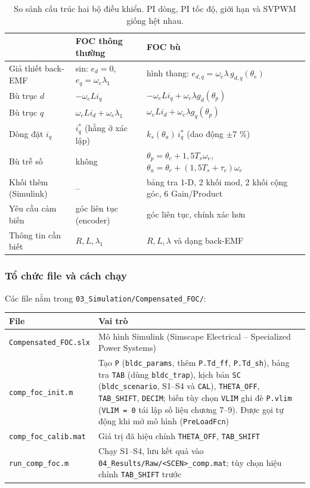 \begin{table}[H]
\centering\small
\caption{So sánh cấu trúc hai bộ điều khiển. PI dòng, PI tốc độ, giới hạn và SVPWM giống hệt nhau.}\label{tab:6.1}
\begin{tabularx}{\linewidth}{@{}ll>{\raggedright\arraybackslash}X@{}}
\toprule
 & FOC thông thường & FOC bù \\ \midrule
Giả thiết back-EMF & sin: $e_d = 0$, $e_q = \omega_e\lambda_1$ & hình thang: $e_{d,q} = \omega_e\lambda\, g_{d,q}(\theta_e)$ \\
Bù trục $d$ & $-\omega_e L i_q$ & $-\omega_e L i_q + \omega_e\lambda g_d(\theta_p)$ \\
Bù trục $q$ & $\omega_e L i_d + \omega_e\lambda_1$ & $\omega_e L i_d + \omega_e\lambda g_q(\theta_p)$ \\
Dòng đặt $i_q$ & $i_q^*$ (hằng ở xác lập) & $k_s(\theta_a)\, i_q^*$ (dao động $\pm$7 \%) \\
Bù trễ số & không & $\theta_p = \theta_e + 1{,}5T_s\omega_e$, $\theta_a = \theta_e + (1{,}5T_s+\tau_c)\omega_e$ \\
Khối thêm (Simulink) & – & 3 bảng tra 1-D, 2 khối mod, 2 khối cộng góc, 6 Gain/Product \\
Yêu cầu cảm biến & góc liên tục (encoder) & góc liên tục, chính xác hơn \\
Thông tin cần biết & $R, L, \lambda_1$ & $R, L, \lambda$ và dạng back-EMF \\
\bottomrule
\end{tabularx}
\end{table}

\subsubsection{Tổ chức file và cách chạy}\label{sec:6.7.2}

Các file nằm trong \texttt{03\_Simulation/Compensated\_FOC/}:

\begin{center}\small
\begin{tabularx}{\linewidth}{@{}l>{\raggedright\arraybackslash}X@{}}
\toprule
File & Vai trò \\ \midrule
\texttt{Compensated\_FOC.slx} & Mô hình Simulink (Simscape Electrical – Specialized Power Systems) \\
\texttt{comp\_foc\_init.m} & Tạo \texttt{P} (\texttt{bldc\_params}, thêm \texttt{P.Td\_ff}, \texttt{P.Td\_sh}), bảng tra \texttt{TAB} (dùng \texttt{bldc\_trap}), kịch bản \texttt{SC} (\texttt{bldc\_scenario}, S1–S4 và \texttt{CAL}), \texttt{THETA\_OFF}, \texttt{TAB\_SHIFT}, \texttt{DECIM}; biến tùy chọn \texttt{VLIM} ghi đè \texttt{P.vlim} (\texttt{VLIM = 0} tái lập số liệu chương 7–9). Được gọi tự động khi mở mô hình (\texttt{PreLoadFcn}) \\
\texttt{comp\_foc\_calib.mat} & Giá trị đã hiệu chỉnh \texttt{THETA\_OFF}, \texttt{TAB\_SHIFT} \\
\texttt{run\_comp\_foc.m} & Chạy S1–S4, lưu kết quả vào \texttt{04\_Results/Raw/<SCEN>\_comp.mat}; tùy chọn hiệu chỉnh \texttt{TAB\_SHIFT} trước \\
\bottomrule
\end{tabularx}
\end{center}


